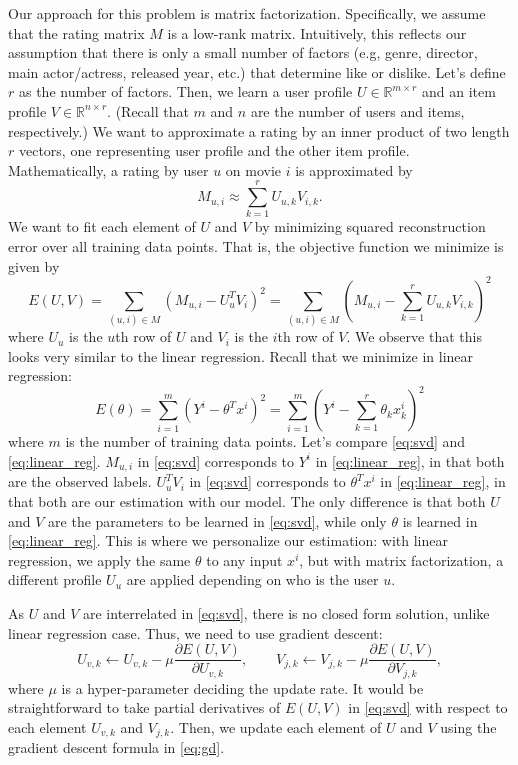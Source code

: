\documentclass[twoside,10pt]{article}
\begin{document}
Our approach for this problem is matrix factorization. Specifically,
we assume that the rating matrix $M$ is a low-rank matrix.
Intuitively, this reflects our assumption that there is only a small
number of factors (e.g, genre, director, main actor/actress,
released year, etc.) that determine like or dislike. Let's define
$r$ as the number of factors. Then, we learn a user profile $U \in
\mathbb{R}^{m \times r}$ and an item profile $V \in \mathbb{R}^{n
\times r}$. (Recall that $m$ and $n$ are the number of users and
items, respectively.) We want to approximate a rating by an inner
product of two length $r$ vectors, one representing user profile and
the other item profile. Mathematically, a rating by user $u$ on
movie $i$ is approximated by
\begin{equation}
M_{u,i} \approx \sum_{k=1}^r U_{u,k} V_{i,k}.
\end{equation}
We want to fit each element of $U$ and $V$ by minimizing squared
reconstruction error over all training data points. That is, the
objective function we minimize is given by
\begin{equation}
E(U,V) = \sum_{(u, i) \in M} (M_{u,i} - U_u^T V_i)^2 = \sum_{(u, i)
\in M} (M_{u,i} - \sum_{k=1}^r U_{u,k} V_{i,k})^2 \label{eq:svd}
\end{equation}
where $U_u$ is the $u$th row of $U$ and $V_i$ is the $i$th row of
$V$. We observe that this looks very similar to the linear
regression. Recall that we minimize in linear regression:
\begin{equation}
E(\theta) = \sum_{i=1}^m (Y^i - \theta^T x^i)^2 = \sum_{i=1}^m (Y^i
- \sum_{k=1}^r \theta_k x^i_k)^2 \label{eq:linear_reg}
\end{equation}
where $m$ is the number of training data points. Let's compare
\eqref{eq:svd} and \eqref{eq:linear_reg}. $M_{u,i}$ in
\eqref{eq:svd} corresponds to $Y^i$ in \eqref{eq:linear_reg}, in
that both are the observed labels. $U_u^T V_i$ in \eqref{eq:svd}
corresponds to $\theta^T x^i$ in \eqref{eq:linear_reg}, in that both
are our estimation with our model. The only difference is that both
$U$ and $V$ are the parameters to be learned in \eqref{eq:svd},
while only $\theta$ is learned in \eqref{eq:linear_reg}. This is
where we personalize our estimation: with linear regression, we
apply the same $\theta$ to any input $x^i$, but with matrix
factorization, a different profile $U_u$ are applied depending on
who is the user $u$.

As $U$ and $V$ are interrelated in \eqref{eq:svd}, there is no
closed form solution, unlike linear regression case. Thus, we need
to use gradient descent:
\begin{equation}
U_{v,k} \gets U_{v,k} - \mu \frac{\partial E(U, V)}{\partial
U_{v,k}}, \quad \quad V_{j,k} \gets V_{j,k} - \mu \frac{\partial
E(U, V)}{\partial V_{j,k}},\label{eq:gd}
\end{equation}
where $\mu$ is a hyper-parameter deciding the update rate. It would
be straightforward to take partial derivatives of $E(U,V)$ in
\eqref{eq:svd} with respect to each element $U_{v,k}$ and $V_{j,k}$.
Then, we update each element of $U$ and $V$ using the gradient
descent formula in \eqref{eq:gd}.
\end{document}
